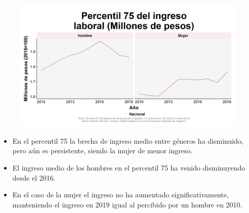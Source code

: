     \begin{figure}[H]
        \caption[Percentil 75 del ingreso laboral por género ]{\label{ingreso_laboral_75_genero} }
        \begin{center}
        \includegraphics[width=\textwidth,keepaspectratio]{img/var_26_trend.png}
        \end{center}
    \end{figure}
            \begin{itemize}
                    \item En el percentil 75 la brecha de ingreso medio entre géneros ha disminuido, pero aún es persistente, siendo la mujer de menor ingreso.
                    \item El ingreso medio de los hombres en el percentil 75 ha venido disminuyendo desde el 2016.
                    \item En el caso de la mujer el ingreso no ha aumentado significativamente, manteniendo el ingreso en 2019 igual al percibido por un hombre en 2010.
                \end{itemize}

